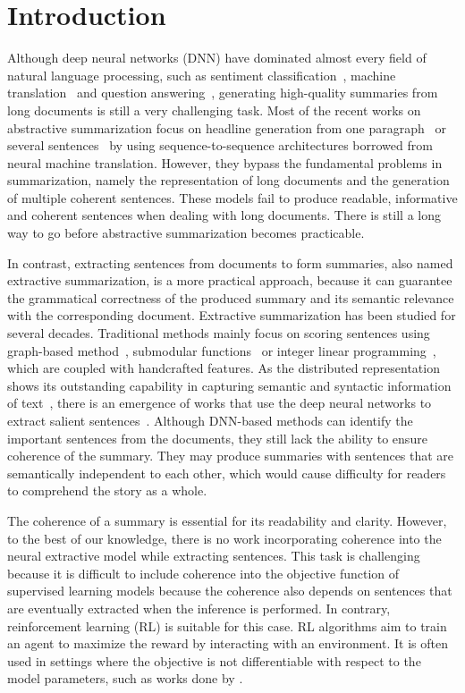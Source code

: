 \documentclass[letterpaper]{article} \usepackage{aaai18}  \usepackage{times}  \usepackage{helvet}  \usepackage{courier}  \usepackage{url}  \usepackage{graphicx}  \usepackage{amssymb}
\begin{document}
	\section{Introduction}
	Although deep neural networks (DNN) have dominated almost every field of natural language processing, such as sentiment classification~\cite{duyutang-sentiment}, machine translation~\cite{cho-translation} and question answering~\cite{xiaoqiang}, generating high-quality summaries from long documents is still a very challenging task. Most of the recent works on abstractive summarization focus on headline generation from one paragraph~\cite{fb2015} or several sentences~\cite{lcsts} by using sequence-to-sequence architectures borrowed from neural machine translation. However, they bypass the fundamental problems in summarization, namely the representation of long documents and the generation of multiple coherent sentences. These models fail to produce readable, informative and coherent sentences when dealing with long documents. There is still a long way to go before abstractive summarization becomes practicable.
	
	In contrast, extracting sentences from documents to form summaries, also named extractive summarization, is a more practical approach, because it can guarantee the grammatical correctness of the produced summary and its semantic relevance with the corresponding document. Extractive summarization has been studied for several decades. Traditional methods mainly focus on scoring sentences using graph-based method~\cite{graph_based}, submodular functions~\cite{lin_class_2011} or integer linear programming~\cite{ilp}, which are coupled with handcrafted features. As the distributed representation shows its outstanding capability in capturing semantic and syntactic information of text~\cite{word2vec,DNV}, there is an emergence of works that use the deep neural networks to extract salient sentences~\cite{jianpeng2016,SummaRuNNer}. Although DNN-based methods can identify the important sentences from the documents, they still lack the ability to ensure coherence of the summary. They may produce summaries with sentences that are semantically independent to each other, which would cause difficulty for readers to comprehend the story as a whole. 
	
	The coherence of a summary is essential for its readability and clarity. However, to the best of our knowledge, there is no work incorporating coherence into the neural extractive model while extracting sentences. This task is challenging because it is difficult to include coherence into the objective function of supervised learning models because the coherence also depends on sentences that are eventually extracted when the inference is performed. In contrary, reinforcement learning (RL) is suitable for this case. RL algorithms aim to train an agent to maximize the reward by interacting with an environment. It is often used in settings where the objective is not differentiable with respect to the model parameters, such as works done by \cite{socher2017_summarization,rl2nmt}.
	
\end{document}
